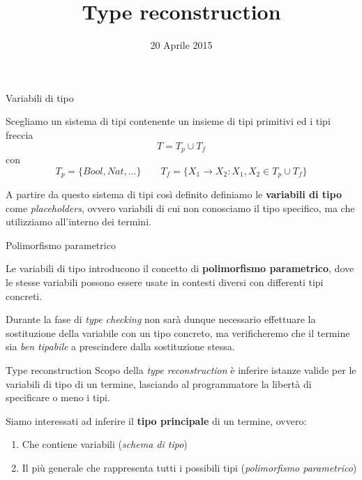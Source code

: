 \documentclass{beamer}
\author{}
\title{\huge Type reconstruction}
\date{20 Aprile 2015}
\begin{document}
\titlepageframe


\begin{tframe}{Variabili di tipo}

Scegliamo un sistema di tipi contenente un insieme di tipi primitivi ed i tipi freccia
$$T = T_p \cup T_f$$
con
$$T_p = \{Bool, Nat, \ldots \} \qquad T_f = \{X_1 \rightarrow X_2 : X_1, X_2 \in T_p \cup T_f \}$$
\vspace{0.1cm}

A partire da questo sistema di tipi così definito definiamo le \textbf{variabili di tipo} come \emph{placeholders}, ovvero variabili di cui non conosciamo il tipo specifico, ma che utilizziamo all'interno dei termini.
\end{tframe}


\begin{tframe}{Polimorfismo parametrico}

Le variabili di tipo introducono il concetto di \textbf{polimorfismo parametrico}, dove le stesse variabili possono essere usate in contesti diversi con differenti tipi concreti.

\vspace{0.4cm}

Durante la fase di \emph{type checking} non sarà dunque necessario effettuare la sostituzione della variabile con un tipo concreto, ma verificheremo che il termine sia \emph{ben tipabile} a prescindere dalla sostituzione stessa.
\end{tframe}



\begin{tframe}{Type reconstruction}
Scopo della \emph{type reconstruction} è inferire istanze valide per le variabili di tipo di un termine, lasciando al programmatore la libertà di specificare o meno i tipi.

\vspace{0.4cm}

Siamo interessati ad inferire il \textbf{tipo principale} di un termine, ovvero:

\vspace{0.1cm}

\begin{enumerate}
\item Che contiene variabili (\emph{schema di tipo})
\item Il più generale che rappresenta tutti i possibili tipi (\emph{polimorfismo parametrico})
\end{enumerate}
\end{tframe}
\end{document}
